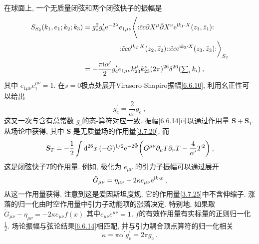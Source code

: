 在球面上, 一个无质量闭弦和两个闭弦快子的振幅是
\begin{align}
		S_{S_{2}}(k_{1}, e_{1} ; k_{2} ; k_{3}) &= g_{\mathrm{c}}^{2} g_{\mathrm{c}}^{\prime} 
		\mathrm{e}^{-2 \lambda} e_{1 \mu \nu} \Biggl\langle: \mathrel{\tilde{c} c \partial X^{\mu} \bar{\partial} X^{\nu} 
		\mathrm{e}^{\mathrm{i} k_{1} \cdot X}(z_{1}, \bar{z}_{1})}: \nonumber \\
		&\qquad \qquad \quad : \mathrel{\tilde{c} c \mathrm{e}^{\mathrm{i} k_{2} \cdot X}(z_{2}, \bar{z}_{2})}:
		: \mathrel{\tilde{c} c \mathrm{e}^{\mathrm{i} k_{3} \cdot X}(z_{3}, \bar{z}_{3})}: \biggr\rangle_{S_{2}}  \nonumber \\
		& =-\frac{\pi \mathrm{i} \alpha^{\prime}}{2} g_{\mathrm{c}}^{\prime} e_{1 \mu \nu} k_{23}^{\mu} k_{23}^{\nu}
		(2 \pi)^{26} \delta^{26}({\textstyle\sum_{i} k_{i}}) \:, \label{6.6.14}
\end{align}
其中 $e_{1 \mu \nu} e_{1}^{\mu \nu}=1$. 在$s=0$极点处展开Virasoro-Shapiro振幅\eqref{6.6.10}, 利用幺正性可以给出
\begin{equation}
	g_{\mathrm{c}}^{\prime}=\frac{2}{\alpha^{\prime}} g_{\mathrm{c}} \:, \label{6.6.15}
\end{equation}
这又一次与含有总常数 $g_{\mathrm{c}} $的态-算符对应一致.  振幅\eqref{6.6.14}可以通过作用量 $\bm{S}+\bm{S}_{T}$从场论中获得, 
其中 $\bm{S}$ 是无质量场的作用量\eqref{3.7.20}, 而
\begin{equation}
	\bm{S}_{T}=-\frac{1}{2} \int \mathrm{d}^{26} x\: (-G)^{1 / 2} \mathrm{e}^{-2 \tilde{\Phi}}
	\biggl(G^{\mu \nu} \partial_{\mu} T \partial_{\nu} T-\frac{4}{\alpha^{\prime}} T^{2} \biggr) \:, \label{6.6.16}
\end{equation}
这是闭弦快子$T$的作用量. 例如, 极化为 $e_{\mu \nu}$ 的引力子振幅可以通过展开
\begin{equation}
	\tilde{G}_{\mu \nu}=\eta_{\mu \nu}-2 \kappa e_{\mu \nu} \mathrm{e}^{\mathrm{i} k \cdot x} \:, \label{6.6.17}
\end{equation}
从这一作用量获得. 注意到这是爱因斯坦度规, 它的作用量\eqref{3.7.25}中不含伸缩子. 涨落的归一化由时空作用量中引力子动能项的涨落决定. 
特别地, 如果取 $\tilde{G}_{\mu \nu}-\eta_{\mu \nu}=-2 \kappa e_{\mu \nu} f(x)$ 其中$e_{\mu \nu} e^{\mu \nu}=1$, 
$f$的有效作用量有实标量的正则归一化 $\frac{1}{2}$. 场论振幅与弦论结果\eqref{6.6.14}相匹配, 并与引力耦合顶点算符的归一化相关
\begin{equation}
	\kappa=\pi \alpha^{\prime} g_{\mathrm{c}}^{\prime}=2 \pi g_{\mathrm{c}} \:. \label{6.6.18}
\end{equation}

